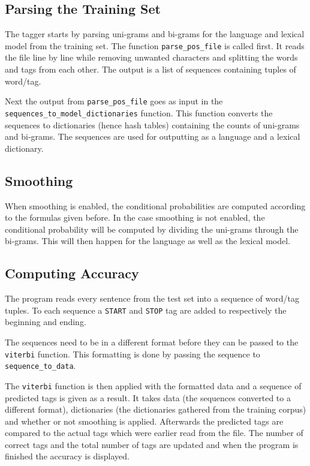 \documentclass[titlepage,a4paper, 10pt]{article}
\begin{document}
\subsection{Parsing the Training Set}
The tagger starts by parsing uni-grams and bi-grams for the language and lexical model from the training set.
The function \texttt{parse\_pos\_file} is called first. 
It reads the file line by line while removing unwanted characters and splitting the words and tags from each other.
The output is a list of sequences containing tuples of word/tag.

Next the output from \texttt{parse\_pos\_file} goes as input in the \\
\texttt{sequences\_to\_model\_dictionaries} function. 
This function converts the sequences to dictionaries (hence hash tables) containing the counts of uni-grams and bi-grams.
The sequences are used for outputting as a language and a lexical dictionary.

\subsection{Smoothing}
When smoothing is enabled, the conditional probabilities are computed according to the formulas given before.
In the case smoothing is not enabled, the conditional probability will be computed by dividing the uni-grams through the bi-grams.
This will then happen for the language as well as the lexical model. 

\subsection{Computing Accuracy}
The program reads every sentence from the test set into a sequence of word/tag tuples.
To each sequence a \texttt{START} and \texttt{STOP} tag are added to respectively the beginning and ending.

The sequences need to be in a different format before they can be passed to the \texttt{viterbi} function. This formatting is done by passing the sequence to \texttt{sequence\_to\_data}. 

The \texttt{viterbi} function is then applied with the formatted data and a sequence of predicted tags is given as a result.
It takes data (the sequences converted to a different format), dictionaries (the dictionaries gathered from the training corpus) and whether or not smoothing is applied.
Afterwards the predicted tags are compared to the actual tags which were earlier read from the file. 
The number of correct tags and the total number of tags are updated and when the program is finished the accuracy is displayed.
\end{document}
